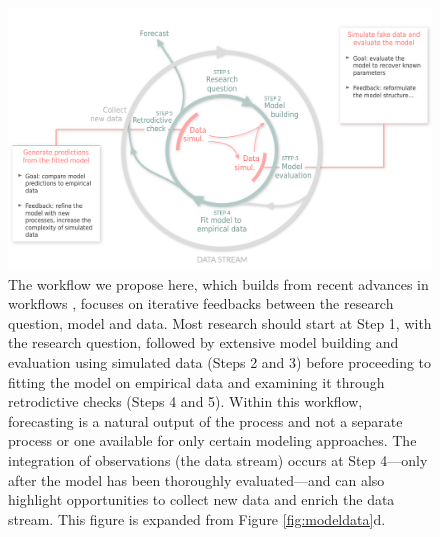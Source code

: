 \documentclass[11pt]{article}
\begin{document}
\begin{figure}[h]
	\centering
	\vspace*{-0.5cm}
    \hspace*{-1.5cm}
	\includegraphics{../figures/figure_worflow_wsteps}
	\caption{The workflow we propose here, which builds from recent advances in workflows \citep[][]{betanworkflow,Gelman2020,Schad2020,grinsztajn2021,vandeschoot2021,Wolkovich2024}, focuses on iterative feedbacks between the research question, model and data. Most research should start at Step 1, with the research question, followed by extensive model building and evaluation using simulated data (Steps 2 and 3) before proceeding to fitting the model on empirical data and examining it through retrodictive checks (Steps 4 and 5). Within this workflow, forecasting is a natural output of the process and not a separate process or one available for only certain modeling approaches.  The integration of observations (the data stream) occurs at Step 4---only after the model has been thoroughly evaluated---and can also highlight opportunities to collect new data and enrich the data stream. This figure is expanded from Figure \ref{fig:modeldata}d.}
	\vspace*{-0cm}
	\label{fig:workflow}
\end{figure}
\end{document}
